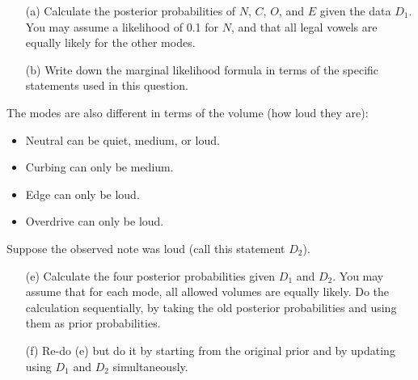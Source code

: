 \documentclass[a4paper, 12pt]{article}
\begin{document}
\begin{enumerate}
\item[(a)] Calculate the posterior
           probabilities of $N$, $C$, $O$, and $E$ given the data $D_1$.
           You may assume a likelihood of 0.1 for $N$, and that all legal
           vowels are equally likely for the other modes.
\item[(b)] Write down the marginal likelihood formula in terms of the
           specific statements used in this question.
\end{enumerate}

The modes are also different in terms of the volume
(how loud they are):
\begin{itemize}
\item Neutral can be quiet, medium, or loud.
\item Curbing can only be medium.
\item Edge can only be loud.
\item Overdrive can only be loud.
\end{itemize}
Suppose the observed note was loud (call this statement $D_2$).

\begin{enumerate}
\item[(e)] Calculate the four posterior probabilities given
           $D_1$ and $D_2$. You may assume that for each mode,
           all allowed volumes are equally likely. Do the calculation
           sequentially, by taking the old posterior probabilities and
           using them as prior probabilities.
\item[(f)] Re-do (e) but do it by starting from the original prior and
           by updating using $D_1$ and $D_2$ simultaneously.
\end{enumerate}
\end{document}
